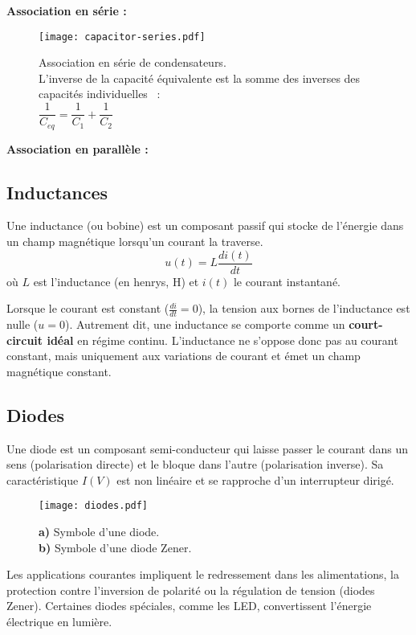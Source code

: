 \textbf{Association en série :}
\begin{figure}[H]
    \centering
    \texttt{[image: capacitor-series.pdf]}
    \caption{\centering
    Association en série de condensateurs.\\
    L’inverse de la capacité équivalente est la somme des inverses des capacités individuelles
    ~:\\
    \(\dfrac{1}{C_{eq}} = \dfrac{1}{C_1} + \dfrac{1}{C_2}\)}
\end{figure}

\textbf{Association en parallèle :}
\begin{figure}[H]
\end{figure}

\subsection{Inductances} \label{subsec:inductors}
Une inductance (ou bobine) est un composant passif qui stocke de l’énergie
dans un champ magnétique lorsqu’un courant la traverse.
\[
u(t) = L \frac{di(t)}{dt}
\]
où \(L\) est l’inductance (en henrys, \unit{\henry}) et \(i(t)\) le courant instantané.

\vspace{\baselineskip}
Lorsque le courant est constant (\(\frac{di}{dt} = 0\)), la tension aux bornes
de l’inductance est nulle (\(u = 0\)). Autrement dit, une inductance se comporte
comme un \textbf{court-circuit idéal} en régime continu. L’inductance ne s’oppose
donc pas au courant constant, mais uniquement aux variations de courant et \'emet un champ
magnétique constant.


\subsection{Diodes} \label{subsec:diodes}
Une diode est un composant semi-conducteur qui laisse passer le courant
dans un sens (polarisation directe) et le bloque dans l’autre (polarisation inverse).
Sa caractéristique \(I(V)\) est non linéaire et se rapproche
d’un interrupteur dirigé.
\begin{figure}[H]
    \centering
    \texttt{[image: diodes.pdf]}
    \caption{\newline
        \textbf{a)} Symbole d’une diode.\\
        \textbf{b)} Symbole d’une diode Zener.
    }
\end{figure}
Les applications courantes impliquent le redressement dans les alimentations, la protection contre l’inversion de polarité
ou la régulation de tension (diodes Zener).
Certaines diodes spéciales, comme les LED, convertissent l’énergie électrique en lumière.

